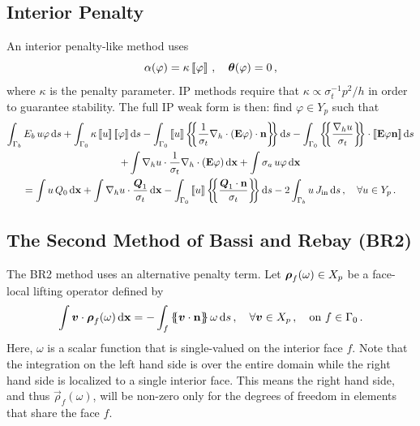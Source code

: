 \documentclass[../doc.tex]{subfiles}
\begin{document}
\subsection{Interior Penalty} \label{dgvef_sec:ip}
An interior penalty-like method uses 
	\begin{equation}
		\alpha(\varphi) = \kappa \left\llbracket\varphi \right\rrbracket \,, \quad \boldsymbol{\theta}(\varphi) = 0 \,, 
	\end{equation}
where $\kappa$ is the penalty parameter. IP methods require that $\kappa \propto \sigma_t^{-1} p^2/h$ in order to guarantee stability. The full IP weak form is then: find $\varphi \in Y_p$ such that 
	\begin{multline} \label{dgvef:ip}
		\int_{\Gamma_b} E_b\, u \varphi \ud s + \int_{\Gamma_0} \kappa \jump{u} \jump{\varphi} \ud s - \int_{\Gamma_0} \jump{u} \avg{\frac{1}{\sigma_t}\nablah\cdot\paren{\E\varphi}\cdot\n} \ud s - \int_{\Gamma_0} \avg{\frac{\nablah u}{\sigma_t}} \cdot \jump{\E\varphi\n} \ud s \\
		+ \int \nablah u \cdot \frac{1}{\sigma_t}\nablah\cdot\paren{\E\varphi} \ud \x + \int \sigma_a\, u \varphi \ud \x \\ 
		= \int u\, Q_0 \ud \x + \int \nablah u \cdot \frac{\vec{Q}_1}{\sigma_t} \ud \x - \int_{\Gamma_0} \jump{u} \avg{\frac{\vec{Q}_1\cdot\n}{\sigma_t}} \ud s - 2\int_{\Gamma_b} u\, \Jin \ud s \,, \quad \forall u \in Y_p \,. 
	\end{multline}

\subsection{The Second Method of Bassi and Rebay (BR2)}
The BR2 method uses an alternative penalty term. Let $\boldsymbol{\rho}_f(\omega)\in X_p$ be a face-local lifting operator defined by 
	\begin{equation} \label{dgvef:rhof}
		\int \boldsymbol{v}\cdot\boldsymbol{\rho}_f(\omega) \mathop{}\!\mathrm{d} \boldsymbol{\mathrm{x}} = -\int_f \left\{\!\!\left\{\boldsymbol{v} \cdot\boldsymbol{\mathrm{n}}\right\}\!\!\right\} \omega \mathop{}\!\mathrm{d} s \,, \quad \forall \boldsymbol{v} \in X_p\,, \quad \text{on} \ f\in \Gamma_0 \,. 
	\end{equation}
Here, $\omega$ is a scalar function that is single-valued on the interior face $f$. Note that the integration on the left hand side is over the entire domain while the right hand side is localized to a single interior face. This means the right hand side, and thus $\vec{\rho}_f(\omega)$, will be non-zero only for the degrees of freedom in elements that share the face $f$. 
\end{document}
